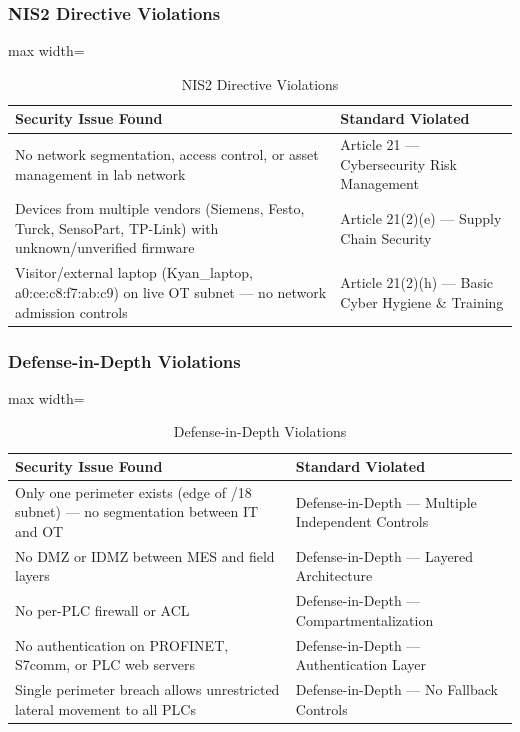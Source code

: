 \subsubsection{NIS2 Directive Violations}

\begin{table}[H]
\centering
\begin{adjustbox}{max width=\textwidth}
\begin{tabular}{@{}p{}p{}@{}}
\toprule
\textbf{Security Issue Found} & \textbf{Standard Violated} \\
\midrule
No network segmentation, access control, or asset management in lab network & Article 21 — Cybersecurity Risk Management \\
Devices from multiple vendors (Siemens, Festo, Turck, SensoPart, TP-Link) with unknown/unverified firmware & Article 21(2)(e) — Supply Chain Security \\
Visitor/external laptop (Kyan\_laptop, a0:ce:c8:f7:ab:c9) on live OT subnet — no network admission controls & Article 21(2)(h) — Basic Cyber Hygiene \& Training \\
\bottomrule
\end{tabular}
\end{adjustbox}
\caption{NIS2 Directive Violations}
\end{table}

\subsubsection{Defense-in-Depth Violations}
\begin{table}[H]
\begin{adjustbox}{max width=\textwidth}
\begin{tabular}{@{}p{}p{}@{}}
\toprule
\textbf{Security Issue Found} & \textbf{Standard Violated} \\
\midrule
Only one perimeter exists (edge of /18 subnet) — no segmentation between IT and OT & Defense-in-Depth — Multiple Independent Controls \\
No DMZ or IDMZ between MES and field layers & Defense-in-Depth — Layered Architecture \\
No per-PLC firewall or ACL & Defense-in-Depth — Compartmentalization \\
No authentication on PROFINET, S7comm, or PLC web servers & Defense-in-Depth — Authentication Layer \\
Single perimeter breach allows unrestricted lateral movement to all PLCs & Defense-in-Depth — No Fallback Controls \\
\bottomrule
\end{tabular}
\end{adjustbox}
\caption{Defense-in-Depth Violations}
\end{table}


